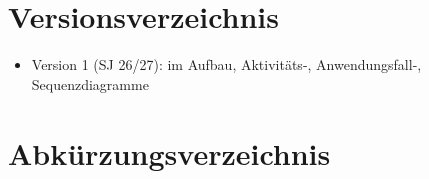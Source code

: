 \documentclass[
11pt,
footheight=41pt
]{scrartcl}
\begin{document}
\section*{Versionsverzeichnis}
\begin{itemize}
	\item Version 1 (SJ 26/27): im Aufbau, Aktivitäts-, Anwendungsfall-, Sequenzdiagramme
\end{itemize}

\listoftodos
\newpage


\tableofcontents
\newpage
\section*{Abkürzungsverzeichnis}
\begin{acronym}[Bash]
\end{acronym}
\listoffigures
\listoftables
\lstlistoflistings
\newpage


\newpage

\newpage

\newpage

\newpage


\newpage

\newpage

\newpage

\newpage


\newpage

\newpage
\end{document}
